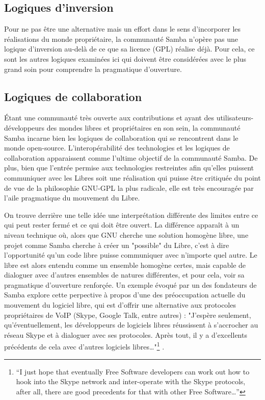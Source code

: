 \subsection{Logiques d'inversion} \label{3.2.3}

Pour ne pas être une alternative mais un effort dans le sens d'incorporer les réalisations du monde propriétaire, la communauté Samba n'opère pas une logique d'inversion au-delà de ce que sa licence (GPL) réalise déjà. Pour cela, ce sont les autres logiques examinées ici qui doivent être considérées avec le plus grand soin pour comprendre la pragmatique d'ouverture.

\subsection{Logiques de collaboration} \label{3.2.4}

\'Etant une communauté très ouverte aux contributions et ayant des utilisateurs-développeurs des mondes libres et propriétaires en son sein, la communauté Samba incarne bien les logiques de collaboration qui se rencontrent dans le monde open-source. L'interopérabilité des technologies et les logiques de collaboration apparaissent comme l'ultime objectif de la communauté Samba. De plus, bien que l'entrée permise aux technologies restreintes afin qu'elles puissent communiquer avec les Libres soit une réalisation qui puisse être critiquée du point de vue de la philosophie GNU-GPL la plus radicale, elle est très encouragée par l'aile pragmatique du mouvement du Libre.

On trouve derrière une telle idée une interprétation différente des limites entre ce qui peut rester fermé et ce qui doit être ouvert. La différence apparaît à un niveau technique où, alors que GNU cherche une solution homogène libre, une projet comme Samba cherche à créer un "possible" du Libre, c'est à dire l'opportunité qu'un code libre puisse communiquer avec n'importe quel autre. Le libre est alors entendu comme un ensemble homogène certes, mais capable de dialoguer avec d'autres ensembles de natures différentes, et pour cela, voir sa pragmatique d'ouverture renforçée. Un exemple évoqué par un des fondateurs de Samba explore cette perpective à propos d'une des préoccupation actuelle du mouvement du logiciel libre, qui est d'offrir une alternative aux protocoles propriétaires de VoIP (Skype, Google Talk, entre autres) : "J'espère seulement, qu'éventuellement, les développeurs de logiciels libres réussissent à s'accrocher au réseau Skype et à dialoguer avec ses protocoles. Après tout, il y a d'excellents précédents de cela avec d'autres logiciels libres\ldots"\footnote{“I just hope that eventually Free Software developers can work out how to hook into the Skype network and inter-operate with the Skype protocols, after all, there are good precedents for that with other Free Software\ldots”} \citep{Allison2005}.

